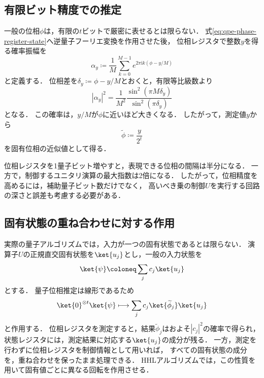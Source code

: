 \subsection{有限ビット精度での推定}
\label{subsec:qpe-finite-precision}

一般の位相$\phi$は，有限の$t$ビットで厳密に表せるとは限らない．
式\eqref{eq:qpe-phase-register-state}へ逆量子フーリエ変換を作用させた後，
位相レジスタで整数$y$を得る確率振幅を
\begin{equation}
  \alpha_y
  \coloneq
  \frac{1}{M}
  \sum_{k=0}^{M-1}
  e^{2\pi\mathrm{i}k(\phi-y/M)}
  \label{eq:qpe-finite-amplitude}
\end{equation}
と定義する．
位相差を$\delta_y\coloneq\phi-y/M$とおくと，有限等比級数より
\begin{equation}
  |\alpha_y|^2
  =
  \frac{1}{M^2}
  \frac{\sin^2(\pi M\delta_y)}
       {\sin^2(\pi\delta_y)}
  \label{eq:qpe-probability-distribution}
\end{equation}
となる．
この確率は，$y/M$が$\phi$に近いほど大きくなる．
したがって，測定値$y$から
\begin{equation}
  \widetilde{\phi}
  \coloneq
  \frac{y}{2^t}
  \label{eq:qpe-phase-estimate}
\end{equation}
を固有位相の近似値として得る．

位相レジスタを1量子ビット増やすと，表現できる位相の間隔は半分になる．
一方で，制御するユニタリ演算の最大指数は2倍になる．
したがって，位相精度を高めるには，補助量子ビット数だけでなく，
高いべき乗の制御$U$を実行する回路の深さと誤差も考慮する必要がある．

\subsection{固有状態の重ね合わせに対する作用}
\label{subsec:qpe-superposition-input}

実際の量子アルゴリズムでは，入力が一つの固有状態であるとは限らない．
演算子$U$の正規直交固有状態を$\ket{u_j}$とし，一般の入力状態を
\begin{equation}
  \ket{\psi}
  \coloneq
  \sum_j c_j\ket{u_j}
  \label{eq:qpe-general-input}
\end{equation}
とする．
量子位相推定は線形であるため
\begin{equation}
  \ket{0}^{\otimes t}\ket{\psi}
  \longmapsto
  \sum_j c_j
  \ket{\widetilde{\phi}_j}\ket{u_j}
  \label{eq:qpe-superposition-output}
\end{equation}
と作用する．
位相レジスタを測定すると，結果$\widetilde{\phi}_j$はおよそ$|c_j|^2$の確率で得られ，
状態レジスタには，測定結果に対応する$\ket{u_j}$の成分が残る．
一方，測定を行わずに位相レジスタを制御情報として用いれば，
すべての固有状態の成分を，重ね合わせを保ったまま処理できる．
HHLアルゴリズムでは，この性質を用いて固有値ごとに異なる回転を作用させる．

